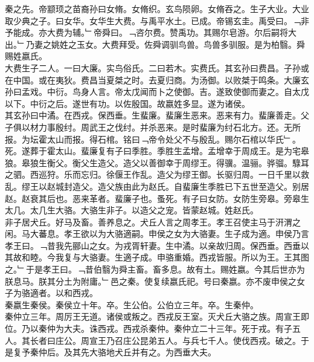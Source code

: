 \documentclass{zhvt-classic}
\begin{document}

\hspace*{2em}秦之先。帝颛顼之苗裔孙曰女脩。女脩织。玄鸟陨卵。女脩吞之。生子大业。大业取少典之子。曰女华。女华生大费。与禹平水土。已成。帝锡玄圭。禹受曰。﹁非予能成。亦大费为辅。﹂帝舜曰。﹁咨尔费。赞禹功。其赐尔皂游。尔后嗣将大出。﹂乃妻之姚姓之玉女。大费拜受。佐舜调驯鸟兽。鸟兽多驯服。是为柏翳。舜赐姓嬴氏。\\
\hspace*{2em}大费生子二人。一曰大廉。实鸟俗氏。二曰若木。实费氏。其玄孙曰费昌。子孙或在中国。或在夷狄。费昌当夏桀之时。去夏归商。为汤御。以败桀于鸣条。大廉玄孙曰孟戏。中衍。鸟身人言。帝太戊闻而卜之使御。吉。遂致使御而妻之。自太戊以下。中衍之后。遂世有功。以佐殷国。故嬴姓多显。遂为诸侯。\\
\hspace*{2em}其玄孙曰中潏。在西戎。保西垂。生蜚廉。蜚廉生恶来。恶来有力。蜚廉善走。父子俱以材力事殷纣。周武王之伐纣。并杀恶来。是时蜚廉为纣石北方。还。无所报。为坛霍太山而报。得石棺。铭曰﹁帝令处父不与殷乱。赐尔石棺以华氏﹂。死。遂葬于霍太山。蜚廉复有子曰季胜。季胜生孟增。孟增幸于周成王。是为宅皋狼。皋狼生衡父。衡父生造父。造父以善御幸于周缪王。得骥。温骊。骅骝。騄耳之驷。西巡狩。乐而忘归。徐偃王作乱。造父为缪王御。长驱归周。一日千里以救乱。缪王以赵城封造父。造父族由此为赵氏。自蜚廉生季胜已下五世至造父。别居赵。赵衰其后也。恶来革者。蜚廉子也。蚤死。有子曰女防。女防生旁皋。旁皋生太几。太几生大骆。大骆生非子。以造父之宠。皆蒙赵城。姓赵氏。\\
\hspace*{2em}非子居犬丘。好马及畜。善养息之。犬丘人言之周孝王。孝王召使主马于汧渭之闲。马大蕃息。孝王欲以为大骆適嗣。申侯之女为大骆妻。生子成为適。申侯乃言孝王曰。﹁昔我先郦山之女。为戎胥轩妻。生中潏。以亲故归周。保西垂。西垂以其故和睦。今我复与大骆妻。生適子成。申骆重婚。西戎皆服。所以为王。王其图之。﹂于是孝王曰。﹁昔伯翳为舜主畜。畜多息。故有土。赐姓嬴。今其后世亦为朕息马。朕其分土为附庸。﹂邑之秦。使复续嬴氏祀。号曰秦嬴。亦不废申侯之女子为骆適者。以和西戎。\\
\hspace*{2em}秦嬴生秦侯。秦侯立十年。卒。生公伯。公伯立三年。卒。生秦仲。\\
\hspace*{2em}秦仲立三年。周厉王无道。诸侯或叛之。西戎反王室。灭犬丘大骆之族。周宣王即位。乃以秦仲为大夫。诛西戎。西戎杀秦仲。秦仲立二十三年。死于戎。有子五人。其长者曰庄公。周宣王乃召庄公昆弟五人。与兵七千人。使伐西戎。破之。于是复予秦仲后。及其先大骆地犬丘并有之。为西垂大夫。\\
\end{document}
